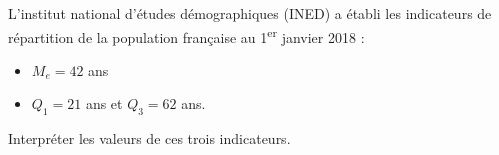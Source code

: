 \begin{exo}
	L'institut national d'études démographiques (INED) a établi les indicateurs de répartition de la population française au 1\textsuperscript{er} janvier 2018 :
	\begin{itemize}
		\item $M_e = 42$ ans
		\item $Q_1 = 21$ ans et $Q_3 = 62$ ans.
	\end{itemize}

	Interpréter les valeurs de ces trois indicateurs.
\end{exo}
